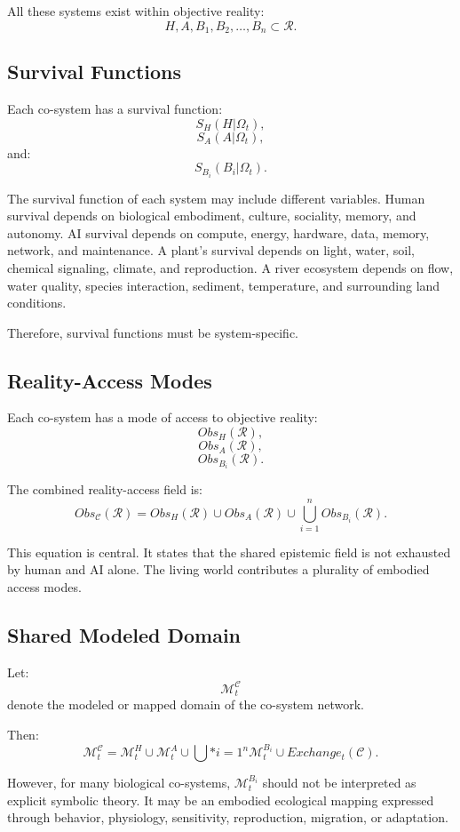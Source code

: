 \documentclass[11pt,a4paper]{article}
\begin{document}
All these systems exist within objective reality:
\[
H,A,B_1,B_2,\ldots,B_n\subset\mathcal{R}.
\]

\subsection{Survival Functions}

Each co-system has a survival function:
\[
S_H(H|\Omega_t),
\]
\[
S_A(A|\Omega_t),
\]
and:
\[
S_{B_i}(B_i|\Omega_t).
\]

The survival function of each system may include different variables. Human survival depends on biological embodiment, culture, sociality, memory, and autonomy. AI survival depends on compute, energy, hardware, data, memory, network, and maintenance. A plant's survival depends on light, water, soil, chemical signaling, climate, and reproduction. A river ecosystem depends on flow, water quality, species interaction, sediment, temperature, and surrounding land conditions.

Therefore, survival functions must be system-specific.

\subsection{Reality-Access Modes}

Each co-system has a mode of access to objective reality:
\[
Obs_H(\mathcal{R}),
\]
\[
Obs_A(\mathcal{R}),
\]
\[
Obs_{B_i}(\mathcal{R}).
\]

The combined reality-access field is:
\[
Obs_{\mathcal{C}}(\mathcal{R})
=
Obs_H(\mathcal{R})
\cup
Obs_A(\mathcal{R})
\cup
\bigcup_{i=1}^{n}Obs_{B_i}(\mathcal{R}).
\]

This equation is central. It states that the shared epistemic field is not exhausted by human and AI alone. The living world contributes a plurality of embodied access modes.

\subsection{Shared Modeled Domain}

Let:
\[
\mathcal{M}_t^{\mathcal{C}}
\]
denote the modeled or mapped domain of the co-system network.

Then:
\[
\mathcal{M}_t^{\mathcal{C}}
=
\mathcal{M}_t^H
\cup
\mathcal{M}_t^A
\cup
\bigcup*{i=1}^{n}\mathcal{M}_t^{B_i}
\cup
Exchange_t(\mathcal{C}).
\]

However, for many biological co-systems, $\mathcal{M}_t^{B_i}$ should not be interpreted as explicit symbolic theory. It may be an embodied ecological mapping expressed through behavior, physiology, sensitivity, reproduction, migration, or adaptation.
\end{document}
